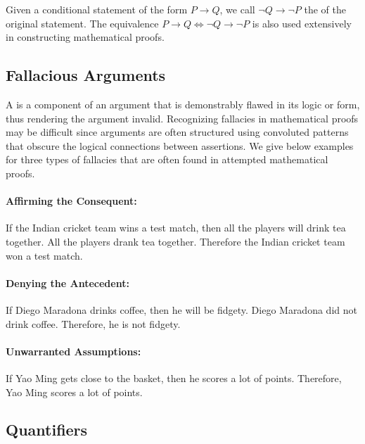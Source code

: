 Given a conditional statement of the form $P \rightarrow Q$, we call $\neg Q \rightarrow \neg P$ the  of the original statement.
The equivalence $P \rightarrow Q \Leftrightarrow \neg Q \rightarrow \neg P$ is also used extensively in constructing mathematical proofs.


\subsection{Fallacious Arguments}

A  is a component of an argument that is demonstrably flawed in its logic or form, thus rendering the argument invalid.
Recognizing fallacies in mathematical proofs may be difficult since arguments are often structured using convoluted patterns that obscure the logical connections between assertions.
We give below examples for three types of fallacies that are often found in attempted mathematical proofs.

\paragraph{Affirming the Consequent:}
If the Indian cricket team wins a test match, then all the players will drink tea together.
All the players drank tea together.
Therefore the Indian cricket team won a test match.

\paragraph{Denying the Antecedent:}
If Diego Maradona drinks coffee, then he will be fidgety.
Diego Maradona did not drink coffee.
Therefore, he is not fidgety.

\paragraph{Unwarranted Assumptions:}
If Yao Ming gets close to the basket, then he scores a lot of points.
Therefore, Yao Ming scores a lot of points.


\subsection{Quantifiers}

